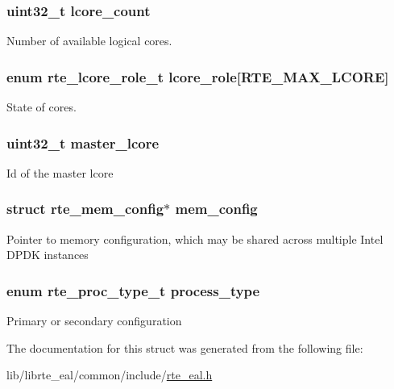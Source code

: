 \subsubsection[{lcore\+\_\+count}]{\setlength{\rightskip}{0pt plus 5cm}uint32\+\_\+t lcore\+\_\+count}\label{structrte__config_a17ac87c5aeee30c5651a0eb3cfa9e0df}
Number of available logical cores. \hypertarget{structrte__config_a79a713f1c76515dd44c9ba8b55d090b5}{}
\subsubsection[{lcore\+\_\+role}]{\setlength{\rightskip}{0pt plus 5cm}enum {\bf rte\+\_\+lcore\+\_\+role\+\_\+t} lcore\+\_\+role\mbox{[}R\+T\+E\+\_\+\+M\+A\+X\+\_\+\+L\+C\+O\+R\+E\mbox{]}}\label{structrte__config_a79a713f1c76515dd44c9ba8b55d090b5}
State of cores. \hypertarget{structrte__config_abe59d1b8baa4c39f023b18bd28bfd555}{}
\subsubsection[{master\+\_\+lcore}]{\setlength{\rightskip}{0pt plus 5cm}uint32\+\_\+t master\+\_\+lcore}\label{structrte__config_abe59d1b8baa4c39f023b18bd28bfd555}
Id of the master lcore \hypertarget{structrte__config_acffed27cbdbce4d200a1b4d37b9a9ce6}{}
\subsubsection[{mem\+\_\+config}]{\setlength{\rightskip}{0pt plus 5cm}struct {\bf rte\+\_\+mem\+\_\+config}$\ast$ mem\+\_\+config}\label{structrte__config_acffed27cbdbce4d200a1b4d37b9a9ce6}
Pointer to memory configuration, which may be shared across multiple Intel D\+P\+D\+K instances \hypertarget{structrte__config_a711b13dd2d53c31332977fb4247ecd98}{}
\subsubsection[{process\+\_\+type}]{\setlength{\rightskip}{0pt plus 5cm}enum {\bf rte\+\_\+proc\+\_\+type\+\_\+t} process\+\_\+type}\label{structrte__config_a711b13dd2d53c31332977fb4247ecd98}
Primary or secondary configuration 

The documentation for this struct was generated from the following file\+:\begin{DoxyCompactItemize}
\item 
lib/librte\+\_\+eal/common/include/\hyperlink{rte__eal_8h}{rte\+\_\+eal.\+h}\end{DoxyCompactItemize}
